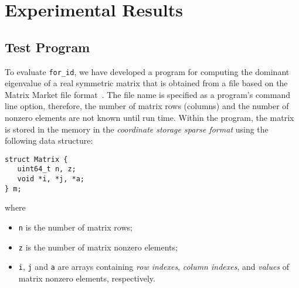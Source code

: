 \documentclass[10pt,a4paper]{article}
\theoremstyle{definition}\newtheorem{problem}{Problem}
\providecommand{\forid}{\texttt{for\_id}\xspace}
\begin{document}
\section{Experimental Results}
\label{sec:results}

\subsection{Test Program}

To evaluate \forid, we have developed a program for computing the dominant eigenvalue of a real symmetric matrix that is obtained from a file based on the Matrix Market file format~\cite{RefWorks:8}. The file name is specified as a program's command line option, therefore, the number of matrix rows (columns) and the number of nonzero elements are not known until run time. Within the program, the matrix is stored in the memory in the \emph{coordinate storage sparse format} using the following data structure:
{\small
\begin{lstlisting}
struct Matrix {
   uint64_t n, z;
   void *i, *j, *a;
} m;
\end{lstlisting}
}
\noindent
where
\begin{itemize}

\item \texttt{n} is the number of matrix rows;

\item \texttt{z} is the number of matrix nonzero elements;

\item \texttt{i}, \texttt{j} and \texttt{a} are arrays containing \emph{row indexes}, \emph{column indexes}, and \emph{values} of matrix nonzero elements, respectively.

\end{itemize}
\end{document}
